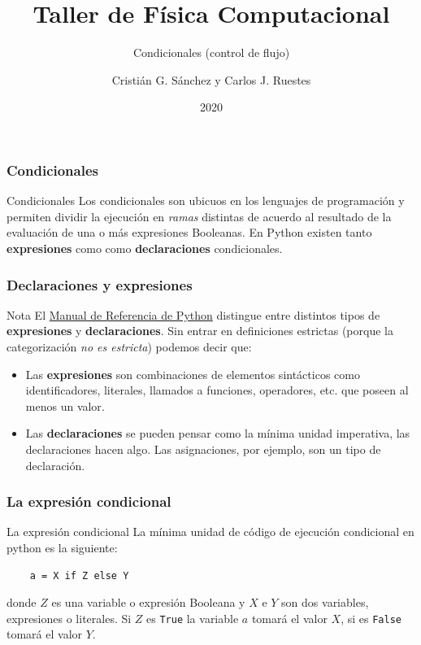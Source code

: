 \documentclass{beamer}
\title{Taller de Física Computacional}
\subtitle{Condicionales (control de flujo)}
\author{Cristián G. Sánchez y Carlos J. Ruestes}
\date{2020}
\begin{document}
\frame{\titlepage}

\begin{frame}[fragile]
    \frametitle{Condicionales}
    \begin{block}{Condicionales}
    Los condicionales son ubicuos en los lenguajes de programación y permiten dividir la ejecución en {\em ramas} distintas
    de acuerdo al resultado de la evaluación de una o más expresiones Booleanas. En Python existen tanto {\bf expresiones} como 
    como {\bf declaraciones} condicionales.
    \end{block}  
    \end{frame}

\begin{frame}[fragile]
    \frametitle{Declaraciones y expresiones}
    \begin{block}{Nota}
        El \href{https://docs.python.org/3/reference/index.html}{Manual de Referencia de Python} distingue entre distintos tipos de {\bf expresiones}
        y {\bf declaraciones}. Sin entrar en definiciones estrictas (porque la categorización {\em no es estricta}) podemos decir que:
        \begin{itemize}
            \item Las {\bf expresiones} son combinaciones de elementos sintácticos como identificadores, literales, llamados a funciones,
            operadores, etc. que poseen al menos un \alert{valor}.
            \item Las {\bf declaraciones} se pueden pensar como la mínima unidad imperativa, las declaraciones \alert{hacen algo}. Las asignaciones,
            por ejemplo, son un tipo de declaración. 
        \end{itemize}
    \end{block}    
    \end{frame}
    
\begin{frame}[fragile]
    \frametitle{La expresión condicional}
    \begin{block}{La expresión condicional}
    La mínima unidad de código de ejecución condicional en python es la siguiente:
    \begin{verbatim}
    a = X if Z else Y
    \end{verbatim}
    donde $Z$ es una variable o expresión Booleana y $X$ e $Y$ son dos variables, expresiones o literales. 
    Si $Z$ es \texttt{True} la variable $a$ tomará el valor $X$, si es \texttt{False} 
    tomará el valor $Y$.
    \end{block}
    \end{frame}
\end{document}
